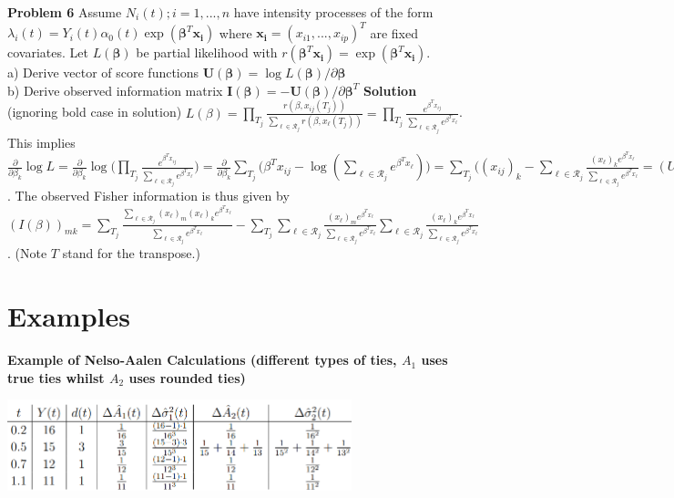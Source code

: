 \documentclass{article}
\begin{document}
\textbf{Problem 6} Assume $N_i(t); i=1,...,n$ have intensity processes of the form $\lambda_i(t) = Y_i(t)\alpha_0(t)\exp(\mathbf{\beta}^T\mathbf{x_i})$ where $\mathbf{x_i} = (x_{i1},...,x_{ip})^T$ are fixed covariates. Let $L(\mathbf{\beta})$ be partial likelihood with $r(\mathbf{\beta}^T\mathbf{x_i}) = \exp(\mathbf{\beta}^T\mathbf{x_i})$. \\
a) Derive vector of score functions $\mathbf{U}(\mathbf{\beta}) = \log L(\mathbf{\beta}) / \partial \mathbf{\beta}$ \\
b) Derive observed information matrix $\mathbf{I}(\mathbf{\beta}) = -\mathbf{U}(\mathbf{\beta}) / \partial \mathbf{\beta}^T$ 
\textbf{Solution} (ignoring bold case in solution) $L(\beta) = \prod_{T_j} \frac{r(\beta, x_{ij}(T_j))}{\sum_{\ell \in \mathcal{R}_j} r(\beta, x_{\ell}(T_j))} =  \prod_{T_j} \frac{e^{\beta^T x_{ij}}}{\sum_{\ell \in \mathcal{R}_j} e^{\beta^T x_{\ell}}}$. This implies $\frac{\partial}{\partial\beta_k}\log L = \frac{\partial}{\partial\beta_k}\log \Big( \prod_{T_j} \frac{e^{\beta^T x_{ij}}}{\sum_{\ell \in \mathcal{R}_j} e^{\beta^T x_{\ell}}} \Big) = 
\frac{\partial}{\partial\beta_k} \sum_{T_j} 
\Big(  \beta^T x_{ij}- \log (\sum_{\ell \in \mathcal{R}_j} e^{\beta^T x_{\ell}}) \Big) =
\sum_{T_j} 
\Big( (x_{ij})_k - \sum_{\ell \in \mathcal{R}_j} \frac{(x_{\ell})_k e^{\beta^T x_{\ell}}}{\sum_{\ell \in \mathcal{R}_j} e^{\beta^T x_{\ell}}} = (U(\beta))_k
$. The observed Fisher information is thus given by \\
$
(I(\beta))_{mk} = \sum_{T_j} \frac{\sum_{\ell \in \mathcal{R}_j} (x_{\ell})_m (x_{\ell})_k e^{\beta^T x_{\ell}}}{\sum_{\ell \in \mathcal{R}_j} e^{\beta^T x_{\ell}}} -
\sum_{T_j} \sum_{\ell \in \mathcal{R}_j}  \frac{(x_{\ell})_m  e^{\beta^T x_{\ell}}}{\sum_{\ell \in \mathcal{R}_j} e^{\beta^T x_{\ell}}} \sum_{\ell \in \mathcal{R}_j} \frac{(x_{\ell})_k  e^{\beta^T x_{\ell}}}{\sum_{\ell \in \mathcal{R}_j} e^{\beta^T x_{\ell}}}
$. (Note $T$ stand for the transpose.)

\section*{Examples}

\textbf{Example of Nelso-Aalen Calculations (different types of ties, $A_1$ uses true ties whilst $A_2$ uses rounded ties)} 

\includegraphics[width=10cm]{surv_table.png}
\end{document}
